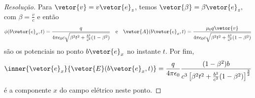\begin{proof}[Resolução]
   Para \(\vetor{v} = v\vetor{e}_z\), temos \(\vetor{\beta} = \beta \vetor{e}_z,\) com \(\beta = \frac{v}{c}\) e então
   \begin{equation*}
      \phi(b \vetor{e}_x, t) = \frac{q}{4\pi \epsilon_0 c \sqrt{\beta^2t^2 + \frac{b^2}{c^2}(1 - \beta^2)}}
      \quad\text{e}\quad
      \vetor{A}(b \vetor{e}_x, t) = \frac{\mu_0 q \vetor{v}}{4\pi \epsilon_0 c \sqrt{\beta^2t^2 + \frac{b^2}{c^2}(1 - \beta^2)}}
   \end{equation*}
   são os potenciais no ponto \(b\vetor{e}_x\) no instante \(t\). Por fim, 
   \begin{equation*}
      \inner{\vetor{e}_x}{\vetor{E}(b\vetor{e}_x, t)} = \frac{q}{4\pi \epsilon_0} \frac{(1 - \beta^2)b}{c^3 \left[\beta^2 t^2 + \frac{b^2}{c^2} (1 - \beta^2)\right]^{\frac32}}
   \end{equation*}
   é a componente \(x\) do campo elétrico neste ponto.
\end{proof}
